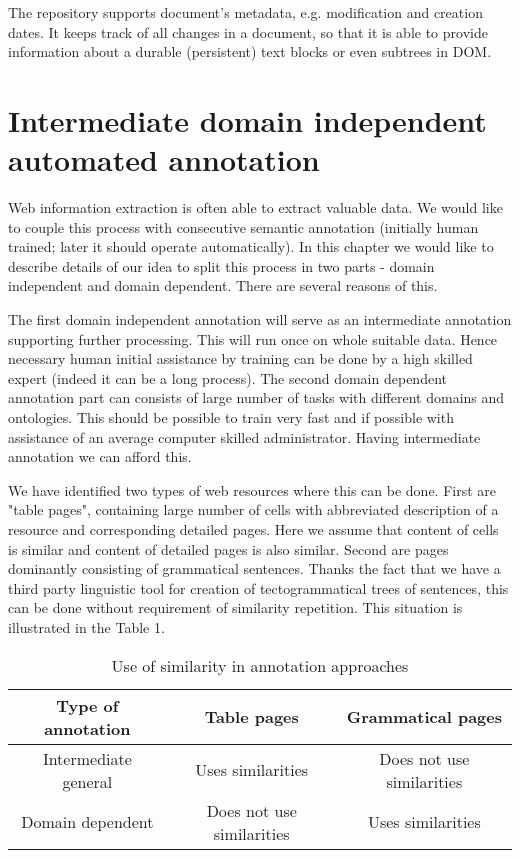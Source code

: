 \documentclass{sig-alternate}
\begin{document}
The repository supports document's metadata, e.g. modification and creation dates. It keeps track of all changes in a document, so that it is able to provide information about a durable (persistent) text blocks or even subtrees in DOM.





\section{Intermediate domain independent automated annotation}
Web information extraction is often able to extract valuable data. We would like to couple this process with consecutive semantic annotation (initially human trained; later it should operate automatically). In this chapter we would like to describe details of our idea to split this process in two parts - domain independent and domain dependent. There are several reasons of this. 

The first domain independent annotation will serve as an intermediate annotation supporting further processing. This will run once on whole suitable data. Hence necessary human initial assistance by training can be done by a high skilled expert (indeed it can be a long process).
The second domain dependent annotation part can consists of large number of tasks with different domains and ontologies. This should be possible to train very fast and if possible with assistance of an average computer skilled administrator. Having intermediate annotation we can afford this. 

We have identified two types of web resources where this can be done. First are "table pages", containing large number of cells with abbreviated description of a resource and corresponding detailed pages. Here we assume that content of cells is similar and content of detailed pages is also similar. Second are pages dominantly consisting of grammatical sentences. Thanks the fact that we have a third party linguistic tool for creation of tectogrammatical trees of sentences, this can be done without requirement of similarity repetition. This situation is illustrated in the Table 1.


\begin{table}
{\tiny\begin{tabular}{|c|c|c|} \hline
Type of annotation&Table pages&Grammatical pages\\ \hline
Intermediate general&Uses similarities&Does not use similarities\\ \hline
Domain dependent&Does not use similarities&Uses similarities\\ \hline
\end{tabular}}
\label{table1}
\caption{Use of similarity in annotation approaches}
\end{table} 
\end{document}
